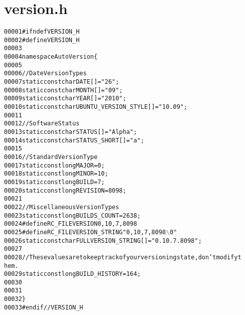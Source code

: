 \hypertarget{version_8h_source}{
\section{version.h}
}


\begin{footnotesize}\begin{alltt}
00001 \textcolor{preprocessor}{#ifndef VERSION\_H}
00002 \textcolor{preprocessor}{}\textcolor{preprocessor}{#define VERSION\_H}
00003 \textcolor{preprocessor}{}
00004 \textcolor{keyword}{namespace }AutoVersion\{
00005         
00006         \textcolor{comment}{//Date Version Types}
00007         \textcolor{keyword}{static} \textcolor{keyword}{const} \textcolor{keywordtype}{char} DATE[] = \textcolor{stringliteral}{"26"};
00008         \textcolor{keyword}{static} \textcolor{keyword}{const} \textcolor{keywordtype}{char} MONTH[] = \textcolor{stringliteral}{"09"};
00009         \textcolor{keyword}{static} \textcolor{keyword}{const} \textcolor{keywordtype}{char} YEAR[] = \textcolor{stringliteral}{"2010"};
00010         \textcolor{keyword}{static} \textcolor{keyword}{const} \textcolor{keywordtype}{char} UBUNTU\_VERSION\_STYLE[] = \textcolor{stringliteral}{"10.09"};
00011         
00012         \textcolor{comment}{//Software Status}
00013         \textcolor{keyword}{static} \textcolor{keyword}{const} \textcolor{keywordtype}{char} STATUS[] = \textcolor{stringliteral}{"Alpha"};
00014         \textcolor{keyword}{static} \textcolor{keyword}{const} \textcolor{keywordtype}{char} STATUS\_SHORT[] = \textcolor{stringliteral}{"a"};
00015         
00016         \textcolor{comment}{//Standard Version Type}
00017         \textcolor{keyword}{static} \textcolor{keyword}{const} \textcolor{keywordtype}{long} MAJOR = 0;
00018         \textcolor{keyword}{static} \textcolor{keyword}{const} \textcolor{keywordtype}{long} MINOR = 10;
00019         \textcolor{keyword}{static} \textcolor{keyword}{const} \textcolor{keywordtype}{long} BUILD = 7;
00020         \textcolor{keyword}{static} \textcolor{keyword}{const} \textcolor{keywordtype}{long} REVISION = 8098;
00021         
00022         \textcolor{comment}{//Miscellaneous Version Types}
00023         \textcolor{keyword}{static} \textcolor{keyword}{const} \textcolor{keywordtype}{long} BUILDS\_COUNT = 2638;
00024 \textcolor{preprocessor}{        #define RC\_FILEVERSION 0,10,7,8098}
00025 \textcolor{preprocessor}{}\textcolor{preprocessor}{        #define RC\_FILEVERSION\_STRING "0, 10, 7, 8098\(\backslash\)0"}
00026 \textcolor{preprocessor}{}        \textcolor{keyword}{static} \textcolor{keyword}{const} \textcolor{keywordtype}{char} FULLVERSION\_STRING[] = \textcolor{stringliteral}{"0.10.7.8098"};
00027         
00028         \textcolor{comment}{//These values are to keep track of your versioning state, don't modify t
      hem.}
00029         \textcolor{keyword}{static} \textcolor{keyword}{const} \textcolor{keywordtype}{long} BUILD\_HISTORY = 164;
00030         
00031 
00032 \}
00033 \textcolor{preprocessor}{#endif //VERSION\_H}
\end{alltt}\end{footnotesize}
